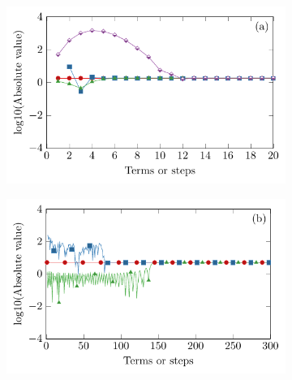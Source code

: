 \begin{figure}[!htb]
    \centering
    \begin{subfigure}{0.49\textwidth}
        \centering
        \includegraphics[width = \textwidth]{fig/compare_jint_200421A_a_200428_v3.pdf}
    \end{subfigure}
    \begin{subfigure}{0.49\textwidth}
        \centering
        \includegraphics[width = \textwidth]{fig/compare_jint_200421A_b_v2.pdf}
    \end{subfigure}
    \\
    \begin{subfigure}{0.49\textwidth}
        \centering

\end{subfigure}
\end{figure}
